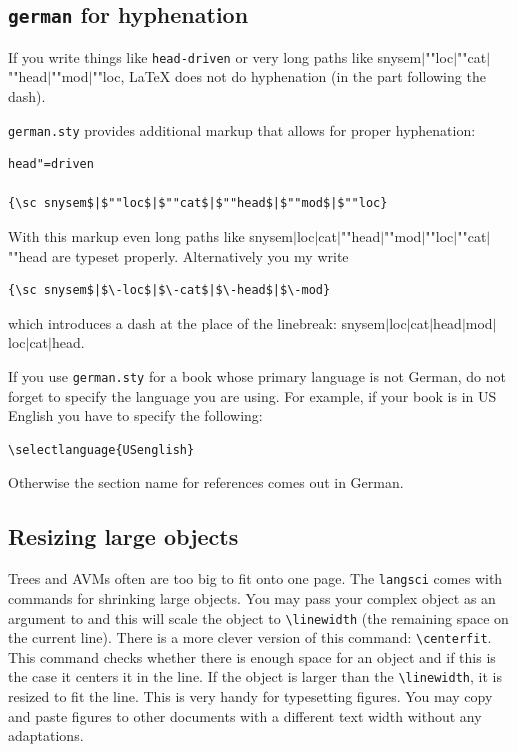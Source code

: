 

\subsection{\texttt{german} for hyphenation}

If you write things like \verb+head-driven+ or very long paths like
{\sc snysem$|$""loc$|$""cat$|$""head$|$""mod$|$""loc}, \LaTeX{} does not do hyphenation
(in the part following the dash).

\verb+german.sty+ provides additional markup that allows for proper hyphenation:
\begin{verbatim}
head"=driven

{\sc snysem$|$""loc$|$""cat$|$""head$|$""mod$|$""loc}
\end{verbatim}
With this markup even long paths like {\sc snysem$|$loc$|$cat$|$""head$|$""mod$|$""loc$|$""cat$|$""head}
are typeset properly. Alternatively you my write
\begin{verbatim}
{\sc snysem$|$\-loc$|$\-cat$|$\-head$|$\-mod}
\end{verbatim}
which introduces a dash at the place of the linebreak:
{\sc snysem$|$\-loc$|$\-cat$|$\-head$|$\-mod$|$\-loc$|$\-cat$|$\-head}.

If you use \verb+german.sty+ for a book whose primary language is not German, do not forget to
specify the language you are using. For example, if your book is in US English you have to specify
the following:
\begin{verbatim}
\selectlanguage{USenglish}
\end{verbatim}
Otherwise the section name for references comes out in German.

\subsection{Resizing large objects}

Trees and AVMs often are too big to fit onto one page. The \texttt{langsci} comes with commands for
shrinking large objects. You may pass your complex object as an argument to \texttt{\oneline} and
this will scale the object to \verb+\linewidth+ (the remaining space on the current line). There is
a more clever version of this command: \verb+\centerfit+. This command checks whether there is
enough space for an object and if this is the case it centers it in the line. If the object is
larger than the \verb+\linewidth+, it is resized to fit the line. This is very handy for typesetting
figures. You may copy and paste figures to other documents with a different text width without any
adaptations.


